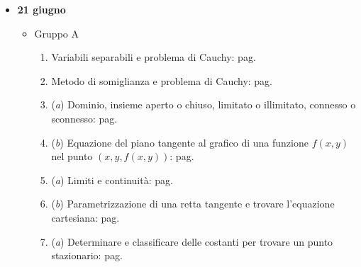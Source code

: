 \documentclass[a4paper]{article}
\begin{document}
\begin{itemize}
\begin{itemize}
			\item \textbf{21 giugno}
			\begin{itemize}
				\item Gruppo A
				\begin{enumerate}[label*=Ex. \arabic*), leftmargin = 4em]
					\item Variabili separabili e problema di Cauchy: pag.~\hyperlink{
						exam: esame 21 giugno 2023 - Gruppo A - 1 esercizio
					}{
					}

					\item Metodo di somiglianza e problema di Cauchy: pag.~\hyperlink{
						exam: esame 21 giugno 2023 - Gruppo A - 2 esercizio
					}{
					}

					\item (\emph{a}) Dominio, insieme aperto o chiuso, limitato o illimitato, connesso o sconnesso: pag.~\hyperlink{
						exam: esame 21 giugno 2023 - Gruppo A - 3 esercizio (a)
					}{
					}

					\setcounter{enumi}{2}

					\item (\emph{b}) Equazione del piano tangente al grafico di una funzione $f\left(x,y\right)$ nel punto $\left(x,y,f\left(x,y\right)\right)$: pag.~\hyperlink{
						exam: esame 21 giugno 2023 - Gruppo A - 3 esercizio (b)
					}{
					}

					\item (\emph{a}) Limiti e continuità: pag.~\hyperlink{
						exam: esame 21 giugno 2023 - Gruppo A - 4 esercizio (a)
					}{
					}
					
					\setcounter{enumi}{3}
					
					\item (\emph{b}) Parametrizzazione di una retta tangente e trovare l'equazione cartesiana: pag.~\hyperlink{
						exam: esame 21 giugno 2023 - Gruppo A - 4 esercizio (b)
					}{
					}

					\item (\emph{a}) Determinare e classificare delle costanti per trovare un punto stazionario: pag.~\hyperlink{
						exam: esame 21 giugno 2023 - Gruppo A - 5 esercizio (a)
					}{
					}


\end{enumerate}
\end{itemize}
\end{itemize}
\end{itemize}
\end{document}
